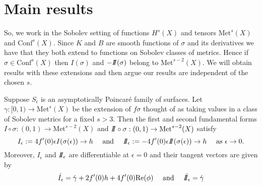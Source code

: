 \section{Main results}





So, we work in the Sobolev setting of functions $H^s(X)$ and tensors $\mathrm{Met}^s(X)$ and $\mathrm{Conf}^s(X)$.
Since $K$ and $B$ are smooth functions of $\sigma$ and its derivatives we have that they both extend to functions on Sobolev classes of metrics.
Hence if $\sigma \in \mathrm{Conf}^s(X)$ then $I(\sigma)$ and $-I\!\!I(\sigma)$ belong to $\mathrm{Met}^{s-2}(X)$.
We will obtain results with these extensions and then argue our results are independent of the chosen $s$. 



\begin{prop}
\label{thm-in-sobolev}
Suppose $S_\epsilon$ is an asymptotically Poincar\'e family of surfaces. 
Let $\gamma : [0,1) \to \mathrm{Met}^s(X)$ be the extension of $f\sigma$ thought of as taking values in a class of Sobolev metrics for a fixed $s > 3$. 
Then the first and second fundamental forms $I \circ \sigma: (0,1) \to \mathrm{Met}^{s-2}(X)$ and  $I\!\!I \circ \sigma: (0,1) \to \mathrm{Met}^{s-2}(X)$ satisfy
\[
I_\epsilon := 4 f'(0) \epsilon I(\sigma(\epsilon)) \to h
\quad \text{ and } \quad
I\!\!I_\epsilon :=  - 4 f'(0) \epsilon I\!\!I(\sigma(\epsilon)) \to h
\quad \text{ as } \epsilon \to 0.
\]
Moreover, $I_\epsilon$ and $I\!\!I_\epsilon$ are differentiable at $\epsilon = 0$ and their tangent vectors are given by 
\[
\dot{I_\epsilon} = \dot{\gamma} + 2 f'(0) h + 4 f'(0) \mathrm{Re}(\phi)
\quad \text{ and } \quad
\dot{I\!\!I_\epsilon} = \dot{\gamma}
\]
\end{prop}

